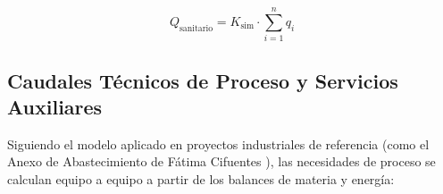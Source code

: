 \documentclass{report}
\begin{document}
\begin{equation}

    Q_{\text{sanitario}} = K_{\text{sim}} \cdot \sum_{i=1}^{n} q_i

\end{equation}



\subsection{Caudales Técnicos de Proceso y Servicios Auxiliares}

Siguiendo el modelo aplicado en proyectos industriales de referencia (como el Anexo de Abastecimiento de Fátima Cifuentes ), las necesidades de proceso se calculan equipo a equipo a partir de los balances de materia y energía:
\end{document}
